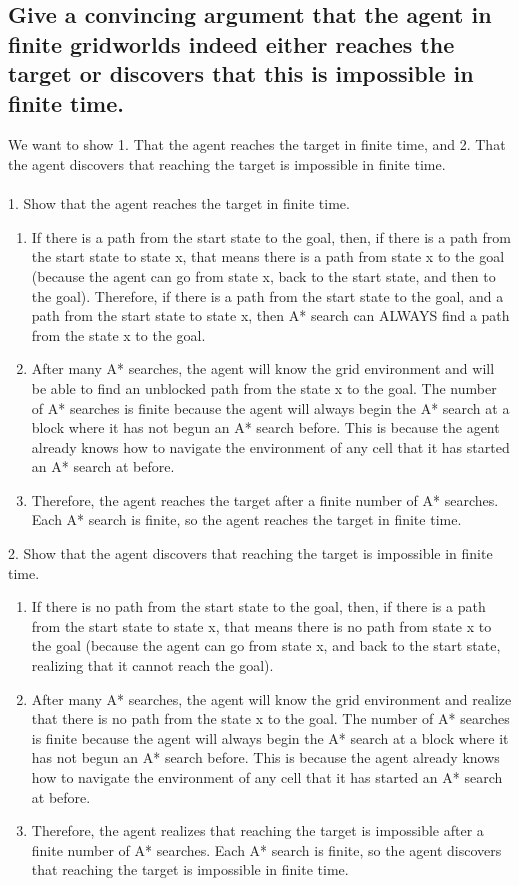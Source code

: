 \documentclass{article}
\begin{document}
\subsection{Give a convincing argument that the agent in finite gridworlds indeed either reaches the target or discovers that this is impossible in finite time. }
We want to show 1. That the agent reaches the target in finite time, and 2. That the agent discovers that reaching the target is impossible in finite time. \\\\
1. Show that the agent reaches the target in finite time.
\begin{enumerate}
	\item If there is a path from the start state to the goal, then, if there is a path from the start state to state x, that means there is a path from state x to the goal (because the agent can go from state x, back to the start state, and then to the goal). Therefore, if there is a path from the start state to the goal, and a path from the start state to state x, then A* search can ALWAYS find a path from the state x to the goal. 
	\item After many A* searches, the agent will know the grid environment and will be able to find an unblocked path from the state x to the goal. The number of A* searches is finite because the agent will always begin the A* search at a block where it has not begun an A* search before. This is because the agent already knows how to navigate the environment of any cell that it has started an A* search at before.
	\item Therefore, the agent reaches the target after a finite number of A* searches. Each A* search is finite, so the agent reaches the target in finite time.
\end{enumerate}
2. Show that the agent discovers that reaching the target is impossible in finite time.
\begin{enumerate}
	\item If there is no path from the start state to the goal, then, if there is a path from the start state to state x, that means there is no path from state x to the goal (because the agent can go from state x, and back to the start state, realizing that it cannot reach the goal).
	\item After many A* searches, the agent will know the grid environment and realize that there is no path from the state x to the goal. The number of A* searches is finite because the agent will always begin the A* search at a block where it has not begun an A* search before. This is because the agent already knows how to navigate the environment of any cell that it has started an A* search at before.
	\item Therefore, the agent realizes that reaching the target is impossible after a finite number of A* searches. Each A* search is finite, so the agent discovers that reaching the target is impossible in finite time.
\end{enumerate}
\end{document}
